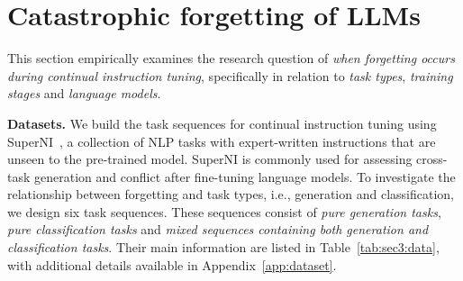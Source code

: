 

\section{Catastrophic forgetting of LLMs}
\label{sec3}

This section empirically examines
the research question of \textit{{when forgetting occurs during continual instruction tuning}}, 
specifically in relation to \textit{task types}, \textit{training stages} and \textit{language models}.


\textbf{Datasets.} We build the task sequences for continual instruction tuning using SuperNI~\citep{wang2022super},   a collection of NLP tasks with expert-written instructions that are unseen to the pre-trained model. SuperNI is commonly used for 
assessing cross-task generation and conflict after fine-tuning language models. 
To investigate the relationship between forgetting and task types, i.e., generation and classification, we design six task sequences.  These sequences consist of \textit{pure generation tasks}, \textit{pure classification tasks} and \textit{mixed sequences containing both generation and classification tasks}. 
Their main information are listed in Table~\ref{tab:sec3:data}, with additional details available in Appendix~\ref{app:dataset}.


